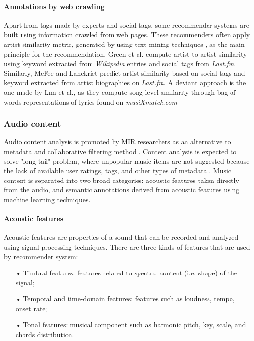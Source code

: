\paragraph{Annotations by web crawling}
Apart from tags made by experts and social tags, some recommender systems are built using information crawled from web pages. These recommenders often apply artist similarity metric, generated by using text mining techniques \cite{schedl2011exploring}, as the main principle for the recommendation. Green et al. \cite{green2009generating} compute artist-to-artist similarity using keyword extracted from \textit{Wikipedia} entries and social tags from \textit{Last.fm}. Similarly, McFee and Lanckriet \cite{mcfee2011learning} predict artist similarity based on social tags and keyword extracted from artist biographies on \textit{Last.fm}. A deviant approach is the one made by Lim et al., as they compute song-level similarity through bag-of-words representations of lyrics found on \textit{musiXmatch.com} \cite{lim2013robust}

\subsubsection{Audio content}
Audio content analysis is promoted by MIR researchers as an alternative to metadata and collaborative filtering method \cite{barrington2009smarter}. Content analysis is expected to solve "long tail" problem, where unpopular music items are not suggested because the lack of available user ratings, tags, and other types of metadata \cite{celma2009music}. Music content is separated into two broad categories: acoustic features taken directly from the audio, and semantic annotations derived from acoustic features using machine learning techniques. 

\paragraph{Acoustic features}
Acoustic features are properties 	of a sound that can be recorded and analyzed using signal processing techniques. There are three kinds of features that are used by recommender system:

\begin{itemize}
\item[•] Timbral features: features related to spectral content (i.e. shape) of the signal;
\item[•] Temporal and time-domain features: features such as loudness, tempo, onset rate;
\item[•] Tonal features: musical component such as harmonic pitch, key, scale, and chords distribution.
\end{itemize}


